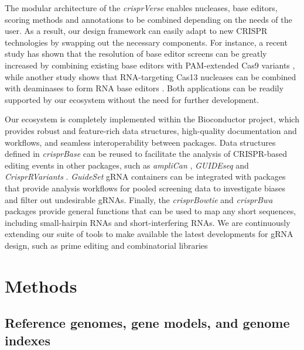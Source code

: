 \documentclass[pdftex,english,10pt]{article}
\begin{document}
The modular architecture of the \textit{crisprVerse} enables nucleases, base editors, scoring methods and annotations to be combined depending on the needs of the user. As a result, our design framework can easily adapt to new CRISPR technologies by swapping out the necessary components. For instance, a recent study has shown that the resolution of base editor screens can be greatly increased by combining existing base editors with PAM-extended Cas9 variants \citep{sangree2021benchmarking}, while another study shows that RNA-targeting Cas13 nucleases can be combined with deaminases to form RNA base editors \citep{rnaediting1}. Both applications can be readily supported by our ecosystem without the need for further development. 


Our ecosystem is completely implemented within the Bioconductor project, which provides robust and feature-rich data structures, high-quality documentation and workflows, and seamless interoperability between packages. Data structures defined in \textit{crisprBase} can be reused to facilitate the analysis of CRISPR-based editing events in other packages, such as \textit{ampliCan} \citep{labun2019accurate}, 
\textit{GUIDEseq} \citep{zhu2017guideseq} and \textit{CrisprRVariants} \citep{lindsay2016crisprvariants}. \textit{GuideSet} gRNA containers can be integrated with packages that provide analysis workflows for pooled screening data  \citep{wang2019integrative, imkeller2020gscreend, gcrisprtools} to investigate biases and filter out undesirable gRNAs. Finally, the \textit{crisprBowtie} and \textit{crisprBwa} packages provide general functions that can be used to map any short sequences, including small-hairpin RNAs and short-interfering RNAs. We are continuously extending our suite of tools to make available the latest developments for gRNA design, such as prime editing \citep{primeediting} and combinatorial libraries \citep{replogle2020combinatorial}
 


\section{Methods}



\subsection*{Reference genomes, gene models, and genome indexes}
\end{document}
